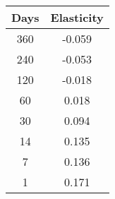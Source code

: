 \begin{tabular}{||c c||}
\hline
Days & Elasticity \\
\hline\hline
360 & -0.059 \\
240 & -0.053 \\
120 & -0.018 \\
60 & 0.018 \\
30 & 0.094 \\
14 & 0.135 \\
7 & 0.136 \\
1 & 0.171 \\
\hline
\end{tabular}
